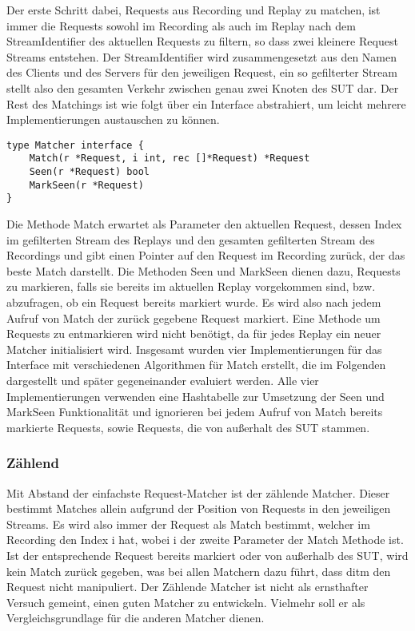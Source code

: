 \documentclass[12pt,a4paper]{report}
\begin{document}
Der erste Schritt dabei, Requests aus Recording und Replay zu matchen, ist immer die Requests sowohl im
Recording als auch im Replay nach dem StreamIdentifier des aktuellen Requests zu filtern, so dass zwei
kleinere Request Streams entstehen. Der StreamIdentifier wird zusammengesetzt aus den Namen des Clients
und des Servers für den jeweiligen Request, ein so gefilterter Stream stellt also den gesamten Verkehr
zwischen genau zwei Knoten des SUT dar.
Der Rest des Matchings ist wie folgt über ein Interface abstrahiert, um leicht mehrere Implementierungen
austauschen zu können.
\begin{verbatim}
type Matcher interface {
   	Match(r *Request, i int, rec []*Request) *Request
   	Seen(r *Request) bool
    MarkSeen(r *Request)
}
\end{verbatim}
Die Methode Match erwartet als Parameter den aktuellen Request, dessen Index im gefilterten Stream des Replays
und den gesamten gefilterten Stream des Recordings und gibt einen Pointer auf den Request im Recording zurück,
der das beste Match darstellt. Die Methoden Seen und MarkSeen dienen dazu, Requests zu markieren, falls sie bereits
im aktuellen Replay vorgekommen sind, bzw. abzufragen, ob ein Request bereits markiert wurde. Es wird also nach jedem Aufruf
von Match der zurück gegebene Request markiert. Eine Methode um Requests zu entmarkieren wird nicht benötigt, da für
jedes Replay ein neuer Matcher initialisiert wird. Insgesamt wurden vier Implementierungen für das Interface mit
verschiedenen Algorithmen für Match erstellt, die im Folgenden dargestellt und später gegeneinander evaluiert werden.
Alle vier Implementierungen verwenden eine Hashtabelle zur Umsetzung der Seen und MarkSeen Funktionalität und ignorieren
bei jedem Aufruf von Match bereits markierte Requests, sowie Requests, die von außerhalt des SUT stammen.
\subsubsection{Zählend}
Mit Abstand der einfachste Request-Matcher ist der zählende Matcher. Dieser bestimmt Matches allein aufgrund der Position
von Requests in den jeweiligen Streams. Es wird also immer der Request als Match bestimmt, welcher im Recording den Index i hat,
wobei i der zweite Parameter der Match Methode ist. Ist der entsprechende Request bereits markiert oder von außerhalb des SUT,
wird kein Match zurück gegeben, was bei allen Matchern dazu führt, dass ditm den Request nicht manipuliert.
Der Zählende Matcher ist nicht als ernsthafter Versuch gemeint, einen guten Matcher zu entwickeln. Vielmehr soll
er als Vergleichsgrundlage für die anderen Matcher dienen.
\end{document}
